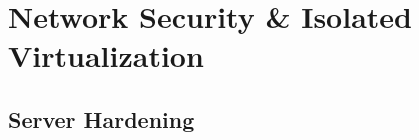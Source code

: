 \chapter{Network Security \& Isolated Virtualization}\label{chap:security}
\section{Server Hardening}